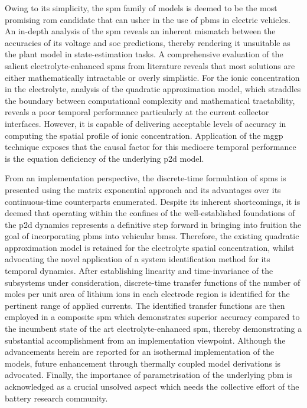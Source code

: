 Owing to its simplicity, the \gls{spm} family of models is deemed to be the most
promising  \gls{rom} candidate  that  can usher  in the  use  of \glspl{pbm}  in
electric vehicles.  An in-depth  analysis of the  \gls{spm} reveals  an inherent
mismatch  between  the accuracies  of  its  voltage and  \gls{soc}  predictions,
thereby rendering it unsuitable as the  plant model in state-estimation tasks. A
comprehensive evaluation  of the  salient electrolyte-enhanced  \glspl{spm} from
literature reveals that most solutions  are either mathematically intractable or
overly  simplistic. For  the ionic  concentration in  the electrolyte,  analysis
of  the quadratic  approximation  model, which  straddles  the boundary  between
computational complexity and mathematical  tractability, reveals a poor temporal
performance particularly  at the  current collector  interfaces. However,  it is
capable of  delivering acceptable  levels of accuracy  in computing  the spatial
profile of ionic concentration. Application  of the \gls{mggp} technique exposes
that the  causal factor for this  mediocre temporal performance is  the equation
deficiency of the underlying \gls{p2d} model.

From an implementation perspective, the discrete-time formulation of \glspl{spm}
is presented  using the matrix  exponential approach and its  advantages over
its continuous-time counterparts enumerated.  Despite its inherent shortcomings,
it  is  deemed  that  operating  within the  confines  of  the  well-established
foundations of  the \gls{p2d} dynamics  represents a definitive step  forward in
bringing  into fruition  the goal  of incorporating  \glspl{pbm} into  vehicular
\glspl{bms}. Therefore,  the existing quadratic approximation  model is retained
for  the   electrolyte  spatial  concentration,  whilst   advocating  the  novel
application  of  a  system  identification method  for  its  temporal  dynamics.
After  establishing  linearity  and  time-invariance  of  the  subsystems  under
consideration, discrete-time transfer functions of  the number of moles per unit
area of  lithium ions in each  electrode region is identified  for the pertinent
range of applied  currents. The identified transfer functions  are then employed
in a  composite \gls{spm} which  demonstrates superior accuracy compared  to the
incumbent state of the art electrolyte-enhanced \gls{spm}, thereby demonstrating
a  substantial accomplishment  from  an implementation  viewpoint. Although  the
advancements herein are reported for an isothermal implementation of the models,
future  enhancement through  thermally coupled  model derivations  is advocated.
Finally,  the  importance of  parametrisation  of  the underlying  \gls{pbm}  is
acknowledged as a  crucial unsolved aspect which needs the  collective effort of
the battery research community.

